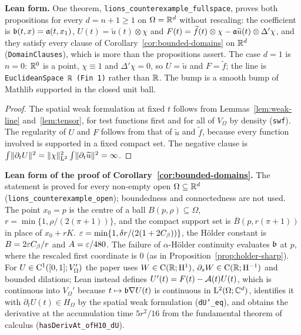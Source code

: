 \textbf{Lean form.}  One theorem, \texttt{lions\_counterexample\_fullspace}, proves both
propositions for every $d=n+1\geq1$ on $\Omega=\mathbb{R}^d$ without rescaling: the coefficient is
$\mathfrak{b}(t,x)=\mathfrak{a}(t,x_1)$, $U(t)=\widetilde u(t)\otimes\chi$ and
$F(t)=\widetilde f(t)\otimes\chi-\mathfrak{a}\widetilde u(t)\otimes\Delta'\chi$, and they satisfy every clause of
Corollary~\ref{cor:bounded-domains} on $\mathbb{R}^d$ (\texttt{DomainClauses}), which is more than the
propositions assert.  The case $d=1$ is $n=0$: $\mathbb{R}^0$ is a point, $\chi\equiv1$ and $\Delta'\chi=0$,
so $U=\widetilde u$ and $F=\widetilde f$; the line is \texttt{EuclideanSpace ℝ (Fin 1)} rather than
$\mathbb{R}$.  The bump is a smooth bump of Mathlib supported in the closed unit ball.

\begin{proof}
  \leanok
  The spatial weak formulation at fixed $t$ follows from Lemmas~\ref{lem:weak-line}
  and~\ref{lem:tensor}, for test functions first and for all of $V_\Omega$ by density
  (\texttt{swf}).  The regularity of $U$ and $F$ follows from that of $\widetilde u$ and
  $\widetilde f$, because every function involved is supported in a fixed compact set.  The negative
  clause is $\int\lVert \partial_tU\rVert^2=\lVert \chi\rVert^2_{\mathrm{L}^2}\int\lVert \partial_t\widetilde u\rVert^2=\infty$.
\end{proof}

\textbf{Lean form of the proof of Corollary~\ref{cor:bounded-domains}.}  The statement is proved for
every non-empty open $\Omega\subseteq\mathbb{R}^d$ (\texttt{lions\_counterexample\_open}); boundedness and
connectedness are not used.  The point $x_0=p$ is the centre of a ball $B(p,\rho)\subseteq\Omega$,
$r=\min\{1,\rho/(2(\pi+1))\}$, and the compact support set is $\overline B(p,r(\pi+1))$ in place of
$x_0+rK$.  $\varepsilon=\min\{1,\delta r/(2(1+2C_\beta))\}$, the H\"older constant is $B=2\varepsilon C_\beta/r$ and
$A=\varepsilon/480$.  The failure of $\alpha$-H\"older continuity evaluates $\mathfrak{b}$ at $p$, where the
rescaled first coordinate is $0$ (as in Proposition~\ref{prop:holder-sharp}).  For
$U\in\mathrm{C}^1([0,1];V_\Omega')$ the paper uses $W\in\mathrm{C}(\mathbb{R};\mathrm{H}^1)$, $\partial_sW\in\mathrm{C}(\mathbb{R};\mathrm{H}^{-1})$ and
bounded dilations; Lean instead defines $U'(t)=F(t)-\mathcal{A}(t)U(t)$, which is continuous into
$V_\Omega'$ because $t\mapsto\mathfrak{b}\nabla U(t)$ is continuous in $\mathrm{L}^2(\Omega;\mathbb{C}^d)$, identifies it
with $\partial_tU(t)\in H_\Omega$ by the spatial weak formulation (\texttt{dU'\_eq}), and obtains the
derivative at the accumulation time $5r^2/16$ from the fundamental theorem of calculus
(\texttt{hasDerivAt\_ofH10\_dU}).

